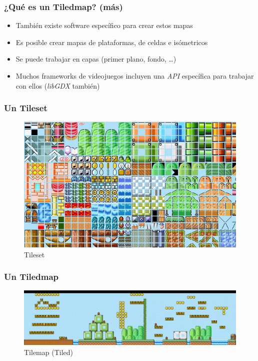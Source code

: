 \documentclass[xcolor={dvipsnames}]{beamer}
\begin{document}
\begin{frame}\frametitle{¿Qué es un Tiledmap? (más)}
    \begin{itemize}
        \item También existe software específico para crear estos mapas \href{http://www.tilededitor.org}{}
        \item Es posible crear mapas de plataformas, de celdas e isómetricos
        \item Se puede trabajar en capas (primer plano, fondo, \ldots)
        \item Muchos frameworks de videojuegos incluyen una \emph{API} específica para trabajar con ellos
        (\emph{\textcolor{resalta}{libGDX}} también)
    \end{itemize}
\end{frame}

\begin{frame}\frametitle{Un Tileset}
    \begin{figure}
    \includegraphics[scale=0.4]{images/tileset}
    \caption{Tileset}
    \end{figure}
\end{frame}

\begin{frame}\frametitle{Un Tiledmap}
    \begin{figure}
    \includegraphics[scale=0.25]{images/tiledmap} 
    \caption{Tilemap (Tiled)}
    \end{figure}
\end{frame}
\end{document}
